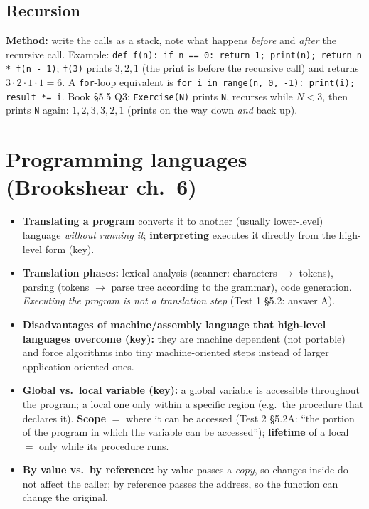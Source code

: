 \documentclass{fkt-notes}
\begin{document}
\subsection{Recursion}
\textbf{Method:} write the calls as a stack, note what happens \emph{before} and \emph{after} the recursive call.
Example: \texttt{def f(n): if n == 0: return 1; print(n); return n * f(n - 1)}; \texttt{f(3)} prints $3,2,1$ (the print is
before the recursive call) and returns $3\cdot2\cdot1\cdot1=6$. A \texttt{for}-loop equivalent is
\texttt{for i in range(n, 0, -1): print(i); result *= i}. Book \S5.5 Q3: \texttt{Exercise(N)} prints
\texttt{N}, recurses while $N<3$, then prints \texttt{N} again: $1,2,3,3,2,1$ (prints on the way down
\emph{and} back up).

\section{Programming languages (Brookshear ch.~6)}
\begin{itemize}[nosep]
  \item \textbf{Translating a program} converts it to another (usually lower-level) language
        \emph{without running it}; \textbf{interpreting} executes it directly from the high-level form (key).
  \item \textbf{Translation phases:} lexical analysis (scanner: characters $\to$ tokens), parsing
        (tokens $\to$ parse tree according to the grammar), code generation. \emph{Executing the program
          is not a translation step} (Test 1 \S5.2: answer A).
  \item \textbf{Disadvantages of machine/assembly language that high-level languages overcome (key):}
        they are machine dependent (not portable) and force algorithms into tiny machine-oriented steps
        instead of larger application-oriented ones.
  \item \textbf{Global vs.\ local variable (key):} a global variable is accessible throughout the program; a local
        one only within a specific region (e.g.\ the procedure that declares it). \textbf{Scope} $=$ where it can be accessed
        (Test 2 \S5.2A: ``the portion of the program in which the variable can be accessed''); \textbf{lifetime} of a local
        $=$ only while its procedure runs.
  \item \textbf{By value vs.\ by reference:} by value passes a \emph{copy}, so changes inside do not affect the
        caller; by reference passes the address, so the function can change the original.
\end{itemize}
\end{document}
